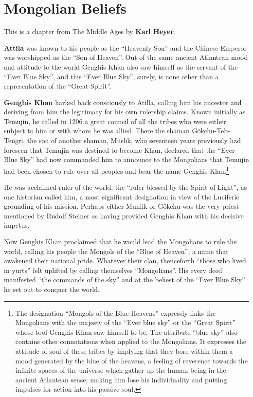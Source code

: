 \section{Mongolian Beliefs}

\begin{quotex}
This is a chapter from The Middle Ages by \textbf{Karl Heyer}.
\end{quotex}


\textbf{Attila} was known to his people as the ``Heavenly Son'' and the Chinese Emperor was worshipped as the ``Son of Heaven''. Out of the same ancient Atlantean mood and attitude to the world Genghis Khan also saw himself as the servant of the ``Ever Blue Sky'', and this ``Ever Blue Sky'', surely, is none other than a representation of the ``Great Spirit''.

\textbf{Genghis Khan} harked back consciously to Atilla, calling him his ancestor and deriving from him the legitimacy for his own rulership claims. Known initially as Temujin, he called in 1206 a great council of all the tribes who were either subject to him or with whom he was allied. There the shaman Gökchu-Teb‐Tengri, the son of another shaman, Muslik, who seventeen years previously had foreseen that Temujin was destined to become Khan, declared that the ``Ever Blue Sky'' had now commanded him to announce to the Mongolians that Temujin had been chosen to rule over all peoples and bear the name Genghis Khan\footnote{The designation ``Mongols of the Blue Heavens'' expressly links the Mongolians with the majesty of the ``Ever blue sky'' or the ``Great Spirit'' whose tool Genghis Khan saw himself to be. The attribute ``blue sky'' also contains other connotations when applied to the Mongolians. It expresses the attitude of soul of these tribes by implying that they bore within them a mood generated by the blue of the heavens, a feeling of reverence towards the infinite spaces of the universe which gather up the human being in the ancient Atlantean sense, making him lose his individuality and putting impulses for action into his passive soul.}


He was acclaimed ruler of the world, the ``ruler blessed by the Spirit of Light'', as one historian called him, a most significant designation in view of the Luciferic grounding of his mission. Perhaps either Munlik or Gökchu was the very priest mentioned by Rudolf Steiner as having provided Genghis Khan with his decisive impetus.

Now Genghis Khan proclaimed that he would lead the Mongolians to rule the world, calling his people the Mongols of the ``Blue of Heaven'', a name that awakened their national pride. Whatever their clan, thenceforth ``those who lived in yurts'' felt uplifted by calling themselves ``Mongolians''. His every deed manifested ``the commands of the sky'' and at the behest of the ``Ever Blue Sky'' he set out to conquer the world.

